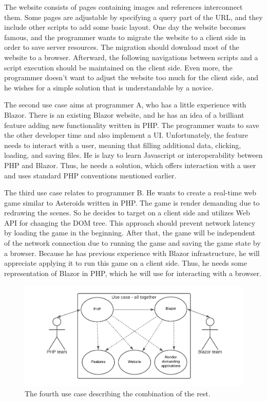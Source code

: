 The website consists of pages containing images and references interconnect them.
Some pages are adjustable by specifying a query part of the URL, and they include other scripts to add some basic layout.
One day the website becomes famous, and the programmer wants to migrate the website to a client side in order to save server resources.
The migration should download most of the website to a browser.
Afterward, the following navigations between scripts and a script execution should be maintained on the client side.
Even more, the programmer doesn't want to adjust the website too much for the client side, and he wishes for a simple solution that is understandable by a novice.
\par
The second use case aims at programmer A, who has a little experience with Blazor.
There is an existing Blazor website, and he has an idea of a brilliant feature adding new functionality written in PHP.
The programmer wants to save the other developer time and also implement a UI.
Unfortunately, the feature needs to interact with a user, meaning that filling additional data, clicking, loading, and saving files.
He is lazy to learn Javascript or interoperability between PHP and Blazor.
Thus, he needs a solution, which offers interaction with a user and uses standard PHP conventions mentioned earlier.
\par
The third use case relates to programmer B.
He wants to create a real-time web game similar to Asteroids written in PHP.
The game is render demanding due to redrawing the scenes.
So he decides to target on a client side and utilizes Web API for changing the DOM tree.
This approach should prevent network latency by loading the game in the beginning.
After that, the game will be independent of the network connection due to running the game and saving the game state by a browser. 
Because he has previous experience with Blazor infrastructure, he will appreciate applying it to run this game on a client side.
Thus, he needs some representation of Blazor in PHP, which he will use for interacting with a browser.
\par
\begin{figure}[b]\centering
\includegraphics[scale=0.8]{./img/UseCaseAllTogether}
\caption{The fourth use case describing the combination of the rest.}
\label{img09:usecase}
\end{figure} 
